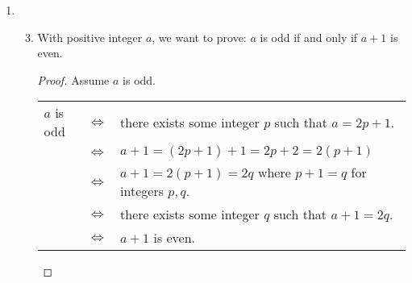 \documentclass[12pt,letterpaper]{article}
\begin{document}
\begin{enumerate}
\begin{enumerate}
\begin{enumerate}
              if $ab$ is odd, then both $a$ and $b$ are odd.

              \begin{proof}
                Assume the statement
                \textit{if $ab$ is odd, then both $a$ and $b$ are odd} is false.

                So we assume $ab$ is odd and one of $a, b$ is odd while the other even.

                We use the result of the proof from $\S 1.4.5$ (i) above,
                namely,
                with integers $x, y$ if $x$ is even and $y$ is odd, then $xy$ is even.

                If we have $a$ odd and $b$ even, then $ab$ is even.
                If we have $b$ odd and $a$ even, then $ba = ab$ is even.

                In either case, we have a contradiction since we assumed $ab$ is odd.

                Since we assumed one statement, and used all true statements to arrive at this contradiction, our assumption was false.

                That is, the statement
                \textit{if $ab$ is odd, then both $a$ and $b$ are odd} is true.

                Thus,
                if $ab$ is odd, then both $a$ and $b$ are odd.
              \end{proof}
          \end{enumerate}
        \item
          \begin{enumerate}
            \setcounter{enumiii}{2}
            \item
              With positive integer $a$, we want to prove:
              $a$ is odd if and only if $a + 1$ is even.

              \begin{proof}

                Assume $a$ is odd.

                \begin{tabularx}{0.95\linewidth}{l@{}c@{}X}
                  $a$ is odd & $\iff$ & there exists some integer $p$ such that $a = 2p + 1$.               \\
                             & $\iff$ & $a + 1 = (2p + 1) + 1 = 2p + 2 = 2(p + 1)$                          \\
                             & $\iff$ & $a + 1 = 2(p + 1) = 2q$ where $p + 1 = q$ for integers $p, q$. \\
                             & $\iff$ & there exists some integer $q$ such that $a + 1 = 2q$.               \\
                             & $\iff$ & $a + 1$ is even.                                                    \\
                \end{tabularx}


\end{proof}
\end{enumerate}
\end{enumerate}
\end{enumerate}
\end{document}
